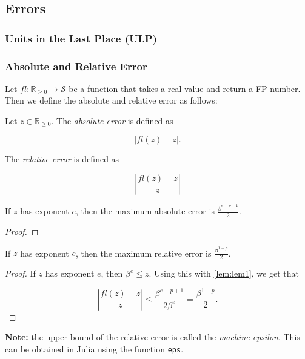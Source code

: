 \documentclass[]{book}
\theoremstyle{definition}
\theoremstyle{definition}
\theoremstyle{definition}
\theoremstyle{remark}
\let\BeginKnitrBlock\begin \let\EndKnitrBlock\end
\begin{document}
\subsection{Errors}\label{errors}

\subsubsection{Units in the Last Place
(ULP)}\label{units-in-the-last-place-ulp}

\subsubsection{Absolute and Relative
Error}\label{absolute-and-relative-error}

Let \(fl: \mathbb{R}_{\geq 0} \rightarrow \mathcal{S}\) be a function
that takes a real value and return a FP number. Then we define the
absolute and relative error as follows:

\BeginKnitrBlock{definition}
\protect\hypertarget{def:unnamed-chunk-5}{}{\label{def:unnamed-chunk-5} }Let
\(z \in \mathbb{R}_{\geq 0}\). The \emph{absolute error} is defined as

\[
\left | fl(z) - z \right | .
\]

The \emph{relative error} is defined as

\[
\left | \frac{fl(z)-z}{z} \right |
\]
\EndKnitrBlock{definition}

\BeginKnitrBlock{lemma}
\protect\hypertarget{lem:lem1}{}{\label{lem:lem1} }If \(z\) has exponent
\(e\), then the maximum absolute error is \(\frac{\beta^{e-p+1}}{2}\).
\EndKnitrBlock{lemma}

\BeginKnitrBlock{proof}
\iffalse{} {Proof. } \fi{}
\EndKnitrBlock{proof}

\BeginKnitrBlock{lemma}
\protect\hypertarget{lem:unnamed-chunk-7}{}{\label{lem:unnamed-chunk-7} }If
\(z\) has exponent \(e\), then the maximum relative error is
\(\frac{\beta^{1-p}}{2}\).
\EndKnitrBlock{lemma}

\BeginKnitrBlock{proof}
\iffalse{} {Proof. } \fi{}If \(z\) has exponent \(e\), then
\(\beta^{e}\leq z\). Using this with \ref{lem:lem1}, we get that

\[
\left | \frac{fl(z)-z}{z} \right | \leq \frac{\beta^{e-p+1}}{2\beta^e} = \frac{\beta^{1-p}}{2}.
\]
\EndKnitrBlock{proof}

\textbf{Note:} the upper bound of the relative error is called the
\emph{machine epsilon}. This can be obtained in Julia using the function
\texttt{eps}.
\end{document}

